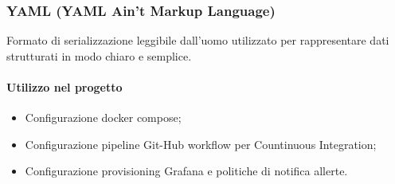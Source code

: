 \subsubsection{YAML (YAML Ain't Markup Language)}
Formato di serializzazione leggibile dall'uomo utilizzato per rappresentare dati strutturati in modo chiaro e semplice.

\paragraph{Utilizzo nel progetto}
\begin{itemize}
    \item Configurazione docker compose;
    \item Configurazione pipeline Git-Hub workflow per Countinuous Integration;
    \item Configurazione provisioning Grafana e politiche di notifica allerte.
\end{itemize}